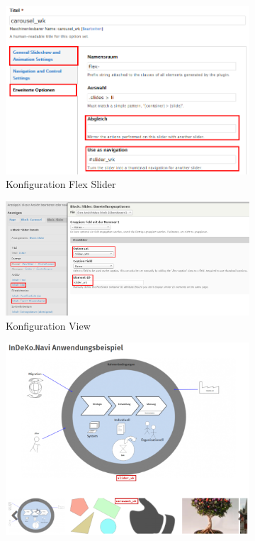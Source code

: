 \begin{figure}[H]
	\centering
	\begin{subfigure}[b]{0.4\textwidth}
		\centering
		\includegraphics[height=0.17\textheight]{images/config_slideroptionset}
		\caption[]{Konfiguration Flex Slider}
		\label{fig:config_slideroptionset}
	\end{subfigure}
	\begin{subfigure}[b]{0.55\textwidth}
		\centering
		\includegraphics[height=0.17\textheight]{images/config_sliderview}
		\caption[]{Konfiguration View}
		\label{fig:config_sliderview}
	\end{subfigure}
	\begin{subfigure}[b]{0.45\textwidth}
		\centering
		\includegraphics[height=0.17\textheight]{images/example_slider}

\end{subfigure}
\end{figure}
